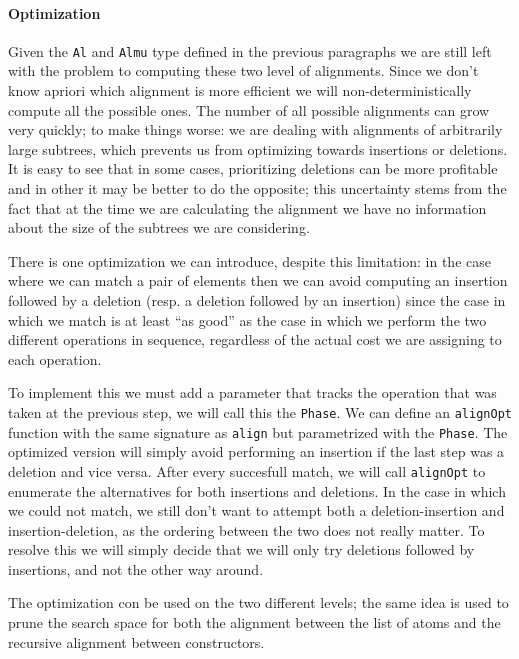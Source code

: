 \documentclass[11pt]{article}
\begin{document}
\paragraph{Optimization}\label{optimizations}

Given the \texttt{Al} and \texttt{Almu} type defined in the previous paragraphs we are still left with the problem
to computing these two level of alignments. Since we don't know apriori which alignment
is more efficient we will non-deterministically compute all the possible ones. The number of all possible alignments  
can grow very quickly; to make things worse: we are dealing with alignments of arbitrarily large subtrees, which prevents
us from optimizing towards insertions or deletions. It is easy to see
that in some cases, prioritizing deletions can be more profitable and in
other it may be better to do the opposite; this uncertainty stems from
the fact that at the time we are calculating the alignment we have no
information about the size of the subtrees we are considering.

There is one optimization we can introduce, despite this limitation: in
the case where we can match a pair of elements then we can avoid
computing an insertion followed by a deletion (resp. a deletion followed
by an insertion) since the case in which we match is at least ``as
good'' as the case in which we perform the two different operations in
sequence, regardless of the actual cost we are assigning to each
operation.

To implement this we must add a parameter that tracks the operation that
was taken at the previous step, we will call this the \texttt{Phase}. We
can define an \texttt{alignOpt} function with the same signature as
\texttt{align} but parametrized with the \texttt{Phase}. The optimized
version will simply avoid performing an insertion if the last step was a
deletion and vice versa. 
After every succesfull match, we will call \texttt{alignOpt} to enumerate the alternatives for both insertions and
deletions. In the case in which we could not match, we still don't 
want to attempt both a deletion-insertion and insertion-deletion, as the 
ordering between the two does not really matter. To resolve this we will simply 
decide that we will only try deletions followed by insertions, and not the other 
way around.

The optimization con be used on the two different levels; the same idea is used to prune the search space 
for both the alignment between the list of atoms and the recursive alignment between constructors.
\end{document}
